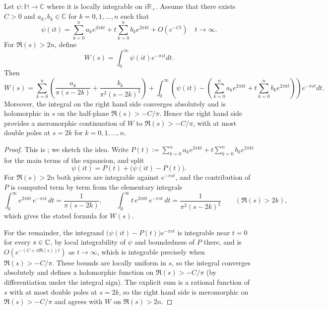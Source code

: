 \begin{proposition}\label{prop:laplace-continuation}
\leanok
    Let $\psi:\mathbb{H}\to\mathbb{C}$ where it is locally integrable on $i\mathbb{R}_+$.
    Assume that there exists $C>0$ and $a_k, b_k \in \mathbb{C}$ for $k = 0, 1, \dots, n$ such that
    \[
    \psi(it) = \sum_{k=0}^{n} a_k e^{2\pi k t} + t\sum_{k=0}^{n} b_k e^{2\pi k t} + O(e^{-Ct})\quad t\to\infty.
    \]
    For $\Re(s) > 2n$, define
    \[
    W(s) = \int_0^\infty \psi(it) e^{-\pi s t} dt.
    \]
    Then
    \[
    W(s) = \sum_{k=0}^{n}\left(\frac{a_k}{\pi(s-2k)} + \frac{b_k}{\pi^2(s-2k)^2}\right) + \int_0^\infty \left(\psi(it) - \left(\sum_{k=0}^{n} a_k e^{2\pi k t} + t\sum_{k=0}^{n} b_k e^{2\pi k t}\right)\right) e^{-\pi s t} dt.
    \]
    Moreover, the integral on the right hand side converges absolutely and is holomorphic in $s$ on the half-plane $\Re(s) > -C/\pi$.
    Hence the right hand side provides a meromorphic continuation of $W$ to $\Re(s) > -C/\pi$, with at most double poles at $s = 2k$ for $k = 0, 1, \dots, n$.
\end{proposition}
\begin{proof}\leanok
    This is \cite[Proposition~2.1]{FGH}; we sketch the idea.
    Write $P(t) := \sum_{k=0}^{n} a_k e^{2\pi k t} + t\sum_{k=0}^{n} b_k e^{2\pi k t}$ for the main terms of the expansion, and split
    \[
    \psi(it) = P(t) + \bigl(\psi(it) - P(t)\bigr).
    \]
    For $\Re(s) > 2n$ both pieces are integrable against $e^{-\pi s t}$, and the contribution of $P$ is computed term by term from the elementary integrals
    \[
    \int_0^\infty e^{2\pi k t}\, e^{-\pi s t}\, dt = \frac{1}{\pi(s - 2k)}, \qquad
    \int_0^\infty t\, e^{2\pi k t}\, e^{-\pi s t}\, dt = \frac{1}{\pi^2(s - 2k)^2} \qquad (\Re(s) > 2k),
    \]
    which gives the stated formula for $W(s)$.

    For the remainder, the integrand $\bigl(\psi(it) - P(t)\bigr) e^{-\pi s t}$ is integrable near $t = 0$ for every $s \in \mathbb{C}$, by local integrability of $\psi$ and boundedness of $P$ there, and is $O(e^{-(C + \pi \Re(s)) t})$ as $t \to \infty$, which is integrable precisely when $\Re(s) > -C/\pi$.
    These bounds are locally uniform in $s$, so the integral converges absolutely and defines a holomorphic function on $\Re(s) > -C/\pi$ (by differentiation under the integral sign).
    The explicit sum is a rational function of $s$ with at most double poles at $s = 2k$, so the right hand side is meromorphic on $\Re(s) > -C/\pi$ and agrees with $W$ on $\Re(s) > 2n$.
\end{proof}

